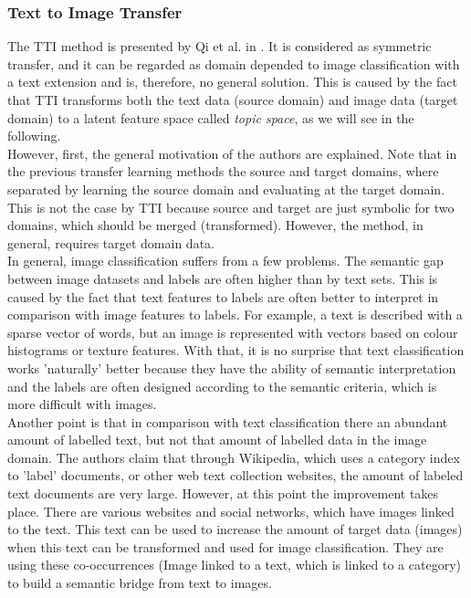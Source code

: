 \subsubsection{Text to Image Transfer}
The \acs{TTI} method is presented by Qi et al. in \cite{Qi.2011}.
It is considered as symmetric transfer, and it can be regarded as domain depended to image classification with a text extension and is, therefore, no general solution.\cite[p. 22]{Weiss.2016}
This is caused by the fact that \ac{TTI} transforms both the text data (source domain) and image data (target domain) to a latent feature space called \textit{topic space}, as we will see in the following.\\
However, first, the general motivation of the authors are explained.
Note that in the previous transfer learning methods the source and target domains, where separated by learning the source domain and evaluating at the target domain.
This is not the case by \acs{TTI} because source and target are just symbolic for two domains, which should be merged (transformed).
However, the method, in general, requires target domain data.\cite{Qi.2011}\\
In general, image classification suffers from a few problems.
The semantic gap between image datasets and labels are often higher than by text sets.
This is caused by the fact that text features to labels are often better to interpret in comparison with image features to labels.
For example, a text is described with a sparse vector of words, but an image is represented with vectors based on colour histograms or texture features.
With that, it is no surprise that text classification works 'naturally' better because they have the ability of semantic interpretation and the labels are often designed according to the semantic criteria, which is more difficult with images.\cite{Qi.2011}\\
Another point is that in comparison with text classification there an abundant amount of labelled text, but not that amount of labelled data in the image domain.
The authors claim that through Wikipedia, which uses a category index to 'label' documents, or other web text collection websites, the amount of labeled text documents are very large.
However, at this point the improvement takes place.
There are various websites and social networks, which have images linked to the text.
This text can be used to increase the amount of target data (images) when this text can be transformed and used for image classification.
They are using these co-occurrences (Image linked to a text, which is linked to a category) to build a semantic bridge from text to images.
